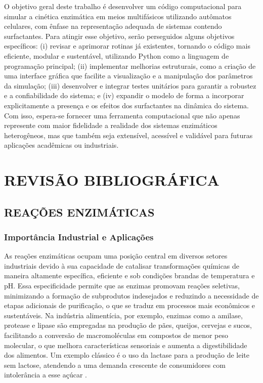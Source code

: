 \documentclass[12pt,oneside]{report}
\begin{document}
O objetivo geral deste trabalho é desenvolver um código computacional para simular a cinética enzimática em meios multifásicos utilizando autômatos celulares, com ênfase na representação adequada de sistemas contendo surfactantes. Para atingir esse objetivo, serão perseguidos alguns objetivos específicos: (i) revisar e aprimorar rotinas já existentes, tornando o código mais eficiente, modular e sustentável, utilizando Python como a linguagem de programação principal; (ii) implementar melhorias estruturais, como a criação de uma interface gráfica que facilite a visualização e a manipulação dos parâmetros da simulação; (iii) desenvolver e integrar testes unitários para garantir a robustez e a confiabilidade do sistema; e (iv) expandir o modelo de forma a incorporar explicitamente a presença e os efeitos dos surfactantes na dinâmica do sistema. Com isso, espera-se fornecer uma ferramenta computacional que não apenas represente com maior fidelidade a realidade dos sistemas enzimáticos heterogêneos, mas que também seja extensível, acessível e validável para futuras aplicações acadêmicas ou industriais.


\chapter{REVISÃO BIBLIOGRÁFICA}
\section{REAÇÕES ENZIMÁTICAS}

\subsection{Importância Industrial e Aplicações}

As reações enzimáticas ocupam uma posição central em diversos setores industriais devido à sua capacidade de catalisar transformações químicas de maneira altamente específica, eficiente e sob condições brandas de temperatura e pH. Essa especificidade permite que as enzimas promovam reações seletivas, minimizando a formação de subprodutos indesejados e reduzindo a necessidade de etapas adicionais de purificação, o que se traduz em processos mais econômicos e sustentáveis. Na indústria alimentícia, por exemplo, enzimas como a amilase, protease e lipase são empregadas na produção de pães, queijos, cervejas e sucos, facilitando a conversão de macromoléculas em compostos de menor peso molecular, o que melhora características sensoriais e aumenta a digestibilidade dos alimentos. Um exemplo clássico é o uso da lactase para a produção de leite sem lactose, atendendo a uma demanda crescente de consumidores com intolerância a esse açúcar \cite{buchholz2016enzymes}.
\end{document}

